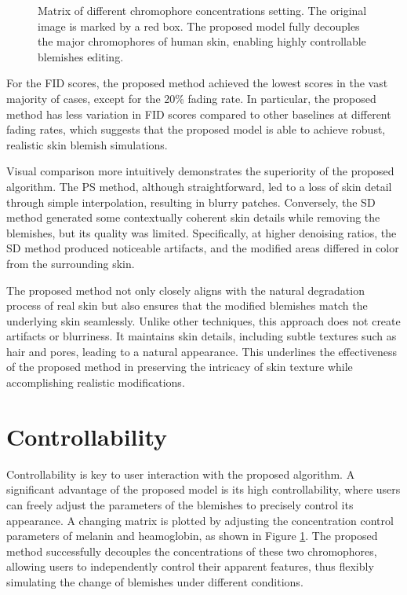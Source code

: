 \begin{spacing}{1.5}
\begin{figure}[t!]
    \caption{Matrix of different chromophore concentrations setting. The original image is marked by a red box. The proposed model fully decouples the major chromophores of human skin, enabling highly controllable blemishes editing.}
    \label{fig:matrix}
\end{figure}
For the FID scores, the proposed method achieved the lowest scores in the vast majority of cases, except for the 20\% fading rate. In particular, the proposed method has less variation in FID scores compared to other baselines at different fading rates, which suggests that the proposed model is able to achieve robust, realistic skin blemish simulations.

Visual comparison more intuitively demonstrates the superiority of the proposed algorithm. The PS method, although straightforward, led to a loss of skin detail through simple interpolation, resulting in blurry patches. Conversely, the SD method generated some contextually coherent skin details while removing the blemishes, but its quality was limited. Specifically, at higher denoising ratios, the SD method produced noticeable artifacts, and the modified areas differed in color from the surrounding skin.

The proposed method not only closely aligns with the natural degradation process of real skin but also ensures that the modified blemishes match the underlying skin seamlessly. Unlike other techniques, this approach does not create artifacts or blurriness. It maintains skin details, including subtle textures such as hair and pores, leading to a natural appearance. This underlines the effectiveness of the proposed method in preserving the intricacy of skin texture while accomplishing realistic modifications.
\section{Controllability}
Controllability is key to user interaction with the proposed algorithm. A significant advantage of the proposed model is its high controllability, where users can freely adjust the parameters of the blemishes to precisely control its appearance.
A changing matrix is plotted by adjusting the concentration control parameters of melanin and heamoglobin, as shown in Figure \ref{fig:matrix}. The proposed method successfully decouples the concentrations of these two chromophores, allowing users to independently control their apparent features, thus flexibly simulating the change of blemishes under different conditions.

\end{spacing}
